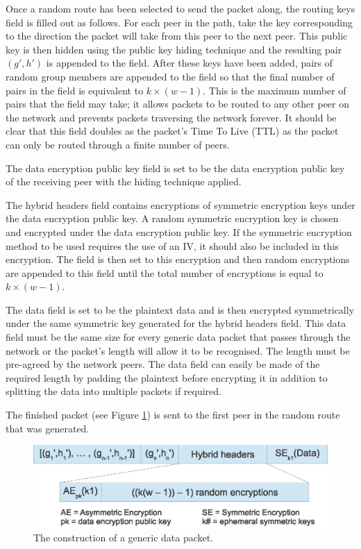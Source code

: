 \documentclass[ %
                    author={Luke Murray},
                supervisor={Dr. Simon Hollis},
                     title={Shadow Peer-to-Peer Networks},
                  subtitle={},
                    degree={MEng},
                      year={2013} ]{thesis}
\begin{document}
Once a random route has been selected to send the packet along, the routing keys field is filled out as follows. For each peer in the path, take the key corresponding to the direction the packet will take from this peer to the next peer. This public key is then hidden using the public key hiding technique and the resulting pair $(g\prime, h\prime)$ is appended to the field. After these keys have been added, pairs of random group members are appended to the field so that the final number of pairs in the field is equivalent to $k \times (w - 1)$. This is the maximum number of pairs that the field may take; it allows packets to be routed to any other peer on the network and prevents packets traversing the network forever. It should be clear that this field doubles as the packet's Time To Live (TTL) as the packet can only be routed through a finite number of peers.

The data encryption public key field is set to be the data encryption public key of the receiving peer with the hiding technique applied.

The hybrid headers field contains encryptions of symmetric encryption keys under the data encryption public key. A random symmetric encryption key is chosen and encrypted under the data encryption public key. If the symmetric encryption method to be used requires the use of an IV, it should also be included in this encryption. The field is then set to this encryption and then random encryptions are appended to this field until the total number of encryptions is equal to $k \times (w - 1)$.

The data field is set to be the plaintext data and is then encrypted symmetrically under the same symmetric key generated for the hybrid headers field. This data field must be the same size for every generic data packet that passes through the network or the packet's length will allow it to be recognised. The length must be pre-agreed by the network peers. The data field can easily be made of the required length by padding the plaintext before encrypting it in addition to splitting the data into multiple packets if required.

The finished packet (see Figure \ref{packet_generic_construction}) is sent to the first peer in the random route that was generated.
\begin{figure}[h]
    \centering
    \includegraphics{diagrams/packet_generic_construction.eps}
    \caption{The construction of a generic data packet.}
    \label{packet_generic_construction}
\end{figure}
\end{document}
